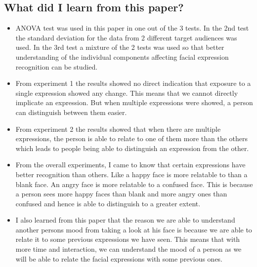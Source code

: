 \documentclass{article}
\begin{document}
		\subsection{What did I learn from this paper?}
			\begin{itemize}
				\item ANOVA test was used in this paper in one out of the 3 tests. In the 2nd test the standard deviation for the data from 2 different target audiences was used. In the 3rd test a mixture of the 2 tests was used so that better understanding of the individual components affecting facial expression recognition can be studied. 
				\item From experiment 1 the results showed no direct indication that exposure to a single expression showed any change. This means that we cannot directly implicate an expression. But when multiple expressions were showed, a person can distinguish between them easier.
				\item From experiment 2 the results showed that when there are multiple expressions, the person is able to relate to one of them more than the others which leads to people being able to distinguish an expression from the other. 
				\item From the overall experiments, I came to know that certain expressions have better recognition than others. Like a happy face is more relatable to than a blank face. An angry face is more relatable to a confused face. This is because a person sees more happy faces than blank and more angry ones than confused and hence is able to distinguish to a greater extent.
				\item I also learned from this paper that the reason we are able to understand another persons mood from taking a look at his face is because we are able to relate it to some previous expressions we have seen. This means that with more time and interaction, we can understand the mood of a person as we will be able to relate the facial expressions with some previous ones.
			\end{itemize}
\end{document}
